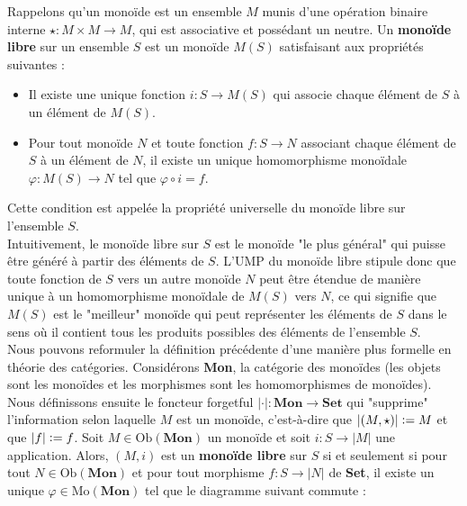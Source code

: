 \documentclass{article}
\begin{document}
\begin{example}{}
    Rappelons qu'un monoïde est un ensemble $M$ munis d'une opération binaire interne $\star:M\times M\to M$, qui est associative et possédant un neutre. Un \textbf{monoïde libre} sur un ensemble $S$ est un monoïde $M(S)$ satisfaisant aux propriétés suivantes :

    \begin{itemize}[label=\textbullet]
        \item Il existe une unique fonction $i:S\to M(S)$ qui associe chaque élément de $S$ à un élément de $M(S)$.
        \item Pour tout monoïde $N$ et toute fonction $f:S\to N$ associant chaque élément de $S$ à un élément de $N$, il existe un unique homomorphisme monoïdale $\varphi:M(S)\to N$ tel que $\varphi\circ i=f$.
    \end{itemize}
    Cette condition est appelée la propriété universelle du monoïde libre sur l'ensemble $S$.\\

    Intuitivement, le monoïde libre sur $S$ est le monoïde "le plus général" qui puisse être généré à partir des éléments de $S$. L'UMP du monoïde libre stipule donc que toute fonction de $S$ vers un autre monoïde $N$ peut être étendue de manière unique à un homomorphisme monoïdale de $M(S)$ vers $N$, ce qui signifie que $M(S)$ est le "meilleur" monoïde qui peut représenter les éléments de $S$ dans le sens où il contient tous les produits possibles des éléments de l'ensemble $S$.\\

    Nous pouvons reformuler la définition précédente d'une manière plus formelle en théorie des catégories. Considérons \textbf{Mon}, la catégorie des monoïdes (les objets sont les monoïdes et les morphismes sont les homomorphismes de monoïdes). Nous définissons ensuite le foncteur forgetful $|\cdot|:\textbf{Mon}\to\textbf{Set}$ qui "supprime" l'information selon laquelle $M$ est un monoïde, c'est-à-dire que $|(M, \star)|\vcentcolon= M$ et que $|f|\vcentcolon= f$. Soit $M\in\text{Ob}(\textbf{Mon})$ un monoïde et soit $i:S\to|M|$ une application. Alors, $(M, i)$ est un \textbf{monoïde libre} sur $S$ si et seulement si pour tout $N\in\text{Ob}(\textbf{Mon})$ et pour tout morphisme $f:S\to|N|$ de \textbf{Set}, il existe un unique $\varphi\in\text{Mo}(\textbf{Mon})$ tel que le diagramme suivant commute :

    \begin{center}
    \end{center}


\end{example}
\end{document}
